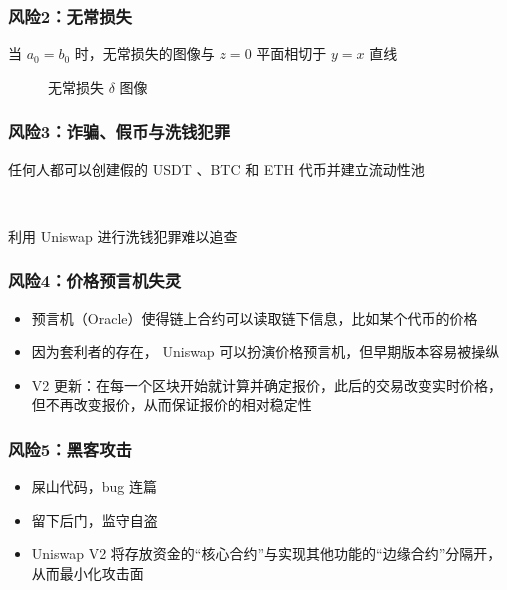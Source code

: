 \documentclass{beamer}
\begin{document}
\begin{frame}
    \frametitle{风险2：无常损失}

    当 $a_0=b_0$ 时，无常损失的图像与 $z=0$ 平面相切于 $y=x$ 直线

    \begin{figure}
        \centering
        \caption{无常损失 $\delta$ 图像}
    \end{figure}
\end{frame}

\begin{frame}
    \frametitle{风险3：诈骗、假币与洗钱犯罪}

    任何人都可以创建假的 USDT 、BTC 和 ETH 代币并建立流动性池

    ~

    利用 Uniswap 进行洗钱犯罪难以追查

\end{frame}

\begin{frame}
    \frametitle{风险4：价格预言机失灵}

    \begin{itemize}
        \item 预言机（Oracle）使得链上合约可以读取链下信息，比如某个代币的价格
        \item 因为套利者的存在， Uniswap 可以扮演价格预言机，但早期版本容易被操纵
        \item V2 更新：在每一个区块开始就计算并确定报价，此后的交易改变实时价格，但不再改变报价，从而保证报价的相对稳定性
    \end{itemize}

\end{frame}

\begin{frame}
    \frametitle{风险5：黑客攻击}

    \begin{itemize}
        \item 屎山代码，bug 连篇
        \item 留下后门，监守自盗
        \item Uniswap V2 将存放资金的“核心合约”与实现其他功能的“边缘合约”分隔开，从而最小化攻击面
    \end{itemize}
\end{frame}
\end{document}
